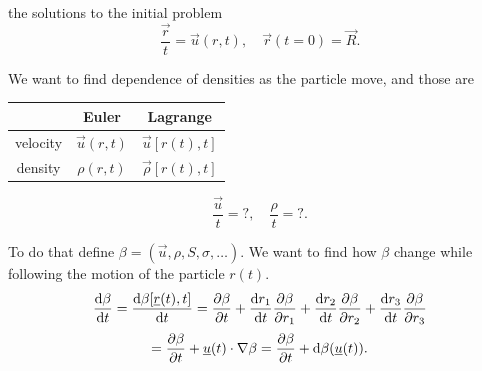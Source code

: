 \documentclass[../main.tex]{subfiles}
\begin{document}
    

    the solutions to the initial problem
    \begin{displaymath}
      \dfrac{\vec r}{t} = \vec u(r,t), \quad \vec r(t = 0) = \vec R.
    \end{displaymath}

    We want to find dependence of densities as the particle move, and those are
    \begin{center}
      \begin{tabular}{c|c|c|}
        & Euler & Lagrange \\
        \hline
        velocity & $\vec u(r, t) $ & $\vec u[ r(t), t]$\\
        density & $\rho(r, t)$ & $\vec \rho[ r(t), t]$\\
        \hline
      \end{tabular}
    \end{center}
    \begin{displaymath}
      \dfrac{\vec u}{t} = ?, \quad \dfrac{\rho}{t} = ?.
    \end{displaymath}
    
    To do that define $\beta = (\vec u, \rho, S, \sigma, \dots)$. 
    We want to find how $\beta$ change while following the motion 
    of the particle $r(t)$.
    \begin{displaymath}
      \frac{\mathrm{d} \beta}{\mathrm{d} t} = \frac{\mathrm{d} \beta[\underline{r}(t),t]}{\mathrm{d} t} = \frac{\partial \beta}{\partial t} + \frac{\mathrm{d} r_1 }{\mathrm{d} t} \frac{\partial \beta}{\partial r_1} 
      + \frac{\mathrm{d} r_2}{\mathrm{d} t} \frac{\partial \beta}{\partial r_2} 
      + \frac{\mathrm{d} r_3}{\mathrm{d} t} \frac{\partial \beta}{\partial r_3}  
    \end{displaymath}
    \begin{displaymath}
      = \frac{\partial \beta}{\partial t} + \underline{u} (t)\cdot \nabla \beta 
      = \frac{\partial \beta}{\partial t} + \mathrm{d} \beta(\underline{u}(t)).
    \end{displaymath}

    \begin{figure}
      \centering
      \label{fig:1.8}
    \end{figure}
\end{document}
